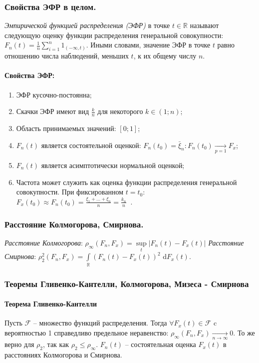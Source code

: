 \documentclass{article}
\begin{document}
    \subsubsection{Свойства ЭФР в целом.}
    \textit{Эмпирической функцией распределения (ЭФР)} в точке $t \in \mathbb{R}$ называют следующую оценку функции распределения генеральной совокупности: $F_n(t) = \frac{1}{n} \sum_{i = 1}^{n} 1_{(-\infty, t)}.$ Иными словами, значение ЭФР в точке $t$ равно отношению числа наблюдений, меньших $t$, к их общему числу $n$.
    \paragraph{Свойства ЭФР:}
    \begin{enumerate}
        \item ЭФР кусочно-постоянна;
        \item Скачки ЭФР имеют вид $\frac{k}{n}$ для некоторого $k \in (1; n)$;
        \item Область принимаемых значений: $[0; 1]$;
        \item $F_n(t)$ является состоятельной оценкой: $F_n(t_0) = \bar{\xi}_n: F_n(t_0) \xrightarrow[p = 1]{} F_x$;
        \item $F_n(t)$ является асимптотически нормальной оценкой;
        \item Частота может служить как оценка функции распределения генеральной
            совокупности. При фиксированном $t = t_0$: $F_x(t_0) \approx F_n(t_0) = \frac{\xi_1 + \ldots + \xi_n}{n} = \frac{k_n}{n}~$ .
    \end{enumerate}
    \subsubsection{Расстояние Колмогорова, Смирнова.}
        \textit{Расстояние Колмогорова}: $\rho_{\infty} (F_n, F_x) = \sup\limits_{t}|F_n(t) - F_x(t)|$
        \newline
        \textit{Расстояние Смирнова}: $\rho^{2}_{2} (F_n, F_x) = \int\limits_{\mathbb{R}}(F_n(t) - F_x(t))^2$ d$F_x(t).$
    \subsubsection{Теоремы Гливенко-Кантелли, Колмогорова, Мизеса - Смирнова}
    \paragraph{Теорема Гливенко-Кантелли}
        Пусть $\mathcal{F}$ -- множество функций распределения. Тогда $\forall F_x(t) \in \mathcal{F}$ c вероятностью 1 справедливо предельное неравенство: $\rho_{\infty} (F_n, F_x) \xrightarrow[n \to \infty]{} 0.$ То же верно для $\rho_2$, так как $\rho_2 \leqslant \rho_{\infty}$. $F_n(t)$ -- состоятельная оценка $F_x(t)$ в расстояниях Колмогорова и Смирнова.
\end{document}
